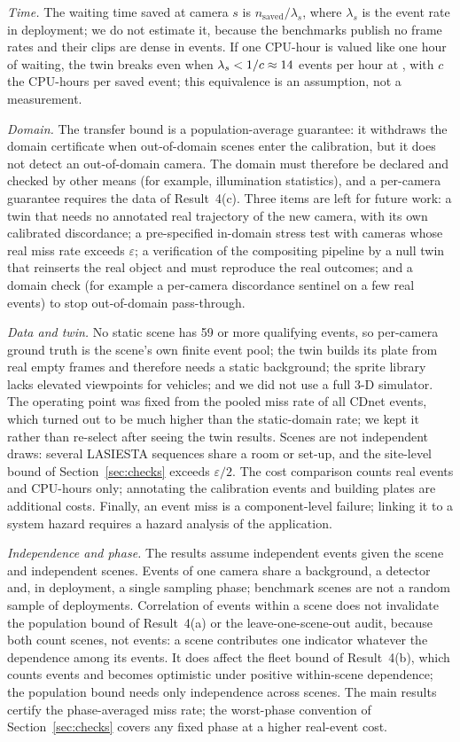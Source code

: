 \emph{Time.} The waiting time saved at camera $s$ is $n_{\mathrm{saved}}/\lambda_s$, where $\lambda_s$ is the event rate
in deployment; we do not estimate it, because the benchmarks publish no frame rates and their clips are dense in events.
If one CPU-hour is valued like one hour of waiting, the twin breaks even when $\lambda_s<1/c\approx14$ events per
hour at \OPs{}, with $c$ the CPU-hours per saved event; this equivalence is an assumption, not a measurement.

\emph{Domain.} The transfer bound is a population-average guarantee: it withdraws the domain certificate when
out-of-domain scenes enter the calibration, but it does not detect an out-of-domain camera. The domain must therefore be
declared and checked by other means (for example, illumination statistics), and a per-camera guarantee requires the
data of Result~4(c). Three items are left for future work: a twin that needs no annotated real trajectory of the new camera, with its own
calibrated discordance; a pre-specified in-domain stress test with cameras whose real miss rate exceeds $\varepsilon$; a verification of the
compositing pipeline by a null twin that reinserts the real object and must reproduce the real outcomes;
and a domain check (for example a per-camera discordance sentinel on a few real events) to stop out-of-domain
pass-through.

\emph{Data and twin.} No static scene has 59 or more qualifying events, so per-camera ground truth is the scene's own
finite event pool; the twin builds its plate from real empty frames and therefore needs a static background; the sprite
library lacks elevated viewpoints for vehicles; and we did not use a full 3-D simulator. The operating point was fixed
from the pooled miss rate of all CDnet events, which turned out to be much higher than the static-domain rate; we kept it
rather than re-select after seeing the twin results. Scenes are not independent draws: several LASIESTA sequences share a room or set-up, and the site-level bound of
Section~\ref{sec:checks} exceeds $\varepsilon/2$. The
cost comparison counts real events and CPU-hours only; annotating the calibration events and building plates are
additional costs. Finally, an event miss is a component-level failure; linking it to a system hazard requires a
hazard analysis of the application.

\emph{Independence and phase.} The results assume independent events given the scene and independent scenes. Events
of one camera share a background, a detector and, in deployment, a single sampling phase; benchmark scenes are not a
random sample of deployments. Correlation of events within a scene does not invalidate the population bound of
Result~4(a) or the leave-one-scene-out audit, because both count scenes, not events: a scene contributes one
indicator whatever the dependence among its events. It does affect the fleet bound of Result~4(b), which counts
events and becomes optimistic under positive within-scene dependence; the population bound needs only independence
across scenes. The main results certify the phase-averaged miss rate; the worst-phase convention of Section~\ref{sec:checks} covers any
fixed phase at a higher real-event cost.


